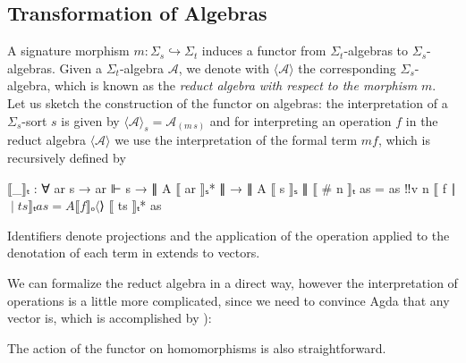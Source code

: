 \subsection{Transformation of Algebras}
\newcommand{\intSign}[2]{#1 \hookrightarrow #2}
\newcommand{\intTheo}[1]{\widetilde{\theory{#1}}}
\newcommand{\algTrans}[1]{\langle \mathcal{#1} \rangle}
\newcommand{\mapSort}[2]{#1\,#2}
\newcommand{\mapOp}[2]{#1\,#2}

A signature morphism
$m\colon\intSign{\Sigma_s}{\Sigma_t}$ induces a functor from
$\Sigma_t$-algebras to
$\Sigma_s$-algebras.  Given a $\Sigma_t$-algebra
$\mathcal{A}$, we denote with
$\algTrans{A}$ the corresponding
$\Sigma_s$-algebra, which is known as the \emph{reduct algebra with
  respect to the morphism} $m$. Let us sketch the construction of
the functor on algebras: the interpretation of a $\Sigma_s$-sort $s$ is given by
  $\algTrans{A}_s = \mathcal{A}_{(\mapSort{m}{s})}$ and 
for interpreting an operation $f$ in the reduct algebra
$\algTrans A$ we use the interpretation of the formal term $m f$, which
is recursively defined by
\begin{spec}
  ⟦_⟧ₜ : ∀ {ar s} → ar ⊩ s → ∥ A ⟦ ar ⟧ₛ* ∥ → ∥ A ⟦ s ⟧ₛ ∥
  ⟦ # n ⟧ₜ      as =  as ‼v n
  ⟦ f ∣$∣ ts ⟧ₜ  as = A ⟦ f ⟧ₒ ⟨$⟩ ⟦ ts ⟧ₜ* as
\end{spec}
\noindent Identifiers denote projections and the application of the
operation 
applied to the denotation of each term in  extends
 to vectors.

We can formalize the reduct algebra in a direct way,
however the interpretation of operations is a little more complicated,
since we need to convince Agda that any vector  
is, which is accomplished
by ):

\noindent The action of the functor on homomorphisms is also straightforward.

